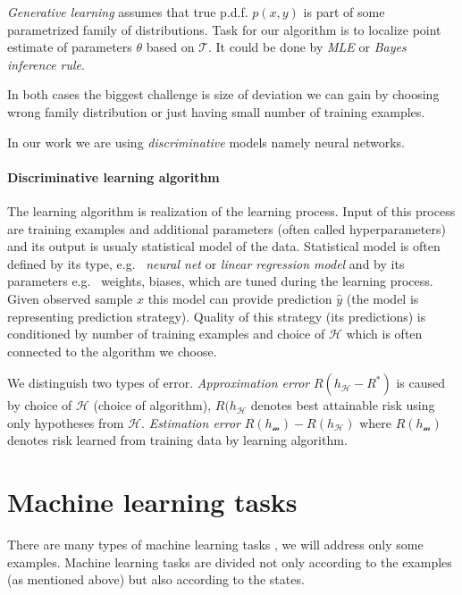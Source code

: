 \emph{Generative learning} assumes that true p.d.f. $p(x,y)$ is part of some parametrized family of distributions. Task for our algorithm is to localize point estimate of parameters $\theta$ based on $\mathcal{T}$. It could be done by \emph{MLE} or \emph{Bayes inference rule}.

In both cases the biggest challenge is size of deviation we can gain by choosing wrong family distribution or just having small number of training examples.

In our work we are using \emph{discriminative} models namely neural networks.

\paragraph{Discriminative learning algorithm}
The learning algorithm is realization of the learning process. Input of this process are training examples and additional parameters (often called hyperparameters) and its output is usualy statistical model of the data. Statistical model is often defined by its type, e.g. \ \emph{neural net} or \emph{linear regression model} and by its parameters e.g. \ weights, biases, which are tuned during the learning process. Given observed sample $x$ this model can provide prediction  $\hat{y}$ (the model is representing prediction strategy). Quality of this strategy (its predictions) is conditioned by number of training examples and choice of $\mathcal{H}$ which is often connected to the algorithm we choose. 

We distinguish two types of error. \emph{Approximation error} $R(h_{\mathcal{H}}-R^*)$  is caused by choice of $\mathcal{H}$ (choice of algorithm), $R(h_{\mathcal{H}}$ denotes best attainable risk using only hypotheses from $\mathcal{H}$. \emph{Estimation error} $R(h_{\mathcal{m}})-R(h_{\mathcal{H}})$ where $R(h_{\mathcal{m}})$ denotes risk learned from training data by learning algorithm.


\section{Machine learning tasks}
There are many types of machine learning tasks \citet{GoodBengCour16}, we will address only some examples. Machine learning tasks are divided not only according to the examples (as mentioned above) but also according to the states.

